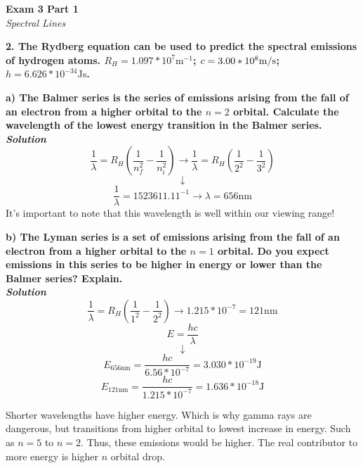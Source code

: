 \documentclass{article}
\begin{document}
    \pagebreak

    \begin{center}
        \textbf{Exam 3 Part 1}\\
        \textit{Spectral Lines}
    \end{center}
    \textbf{2. The Rydberg equation can be used to predict the spectral emissions of hydrogen atoms. $R_{H} = 1.097 * 10^{7}  \si{\meter^{-1}}$; $c = 3.00 * 10^{8} \si[per-mode=symbol]{\meter\per\second}$; $h = 6.626 * 10^{-34} \si{\joule} \si{\second}$.}

    \textbf{a)  The Balmer series is the series of emissions arising from the fall of an electron from a higher orbital to the $n = 2$ orbital. Calculate the wavelength of the lowest energy transition in the Balmer series.}\\
    \textbf{\textit{Solution}}
    $$\dfrac{1}{\lambda} = R_{H}(\dfrac{1}{n^{2}_{f}} - \dfrac{1}{n^{2}_{i}}) \rightarrow \dfrac{1}{\lambda} = R_{H}(\dfrac{1}{2^{2}} - \dfrac{1}{3^{2}})$$
    $$\downarrow$$
    $$\dfrac{1}{\lambda} = 1523611.11^{-1} \rightarrow \lambda = 656 \si{\nano\metre}$$
    It's important to note that this wavelength is well within our viewing range!

    \textbf{b) The Lyman series is a set of emissions arising from the fall of an electron from a higher orbital to the $n = 1$ orbital. Do you expect emissions in this series to be higher in energy or lower than the Balmer series? Explain.}\\
    \textbf{\textit{Solution}}
    $$\dfrac{1}{\lambda} = R_{H}(\dfrac{1}{1^{2}} - \dfrac{1}{2^{2}}) \rightarrow 1.215 * 10^{-7} = 121 \si{\nano\meter}$$
    $$E = \dfrac{hc}{\lambda} $$
    $$ \downarrow $$
    $$E_{656 \si{\nano\meter}} = \dfrac{hc}{6.56 * 10^{-7}}  = 3.030 * 10^{-19} \si{\joule}$$
    $$E_{121 \si{\nano\meter}} = \dfrac{hc}{1.215 * 10^{-7}} = 1.636 * 10^{-18} \si{\joule}$$

    Shorter wavelengths have higher energy. Which is why gamma rays are dangerous, but transitions from higher orbital to lowest increase in energy. Such as $n=5$ to $n=2$. Thus, these emissions would be higher. The real contributor to more energy is higher $n$ orbital drop.

    \pagebreak
\end{document}

